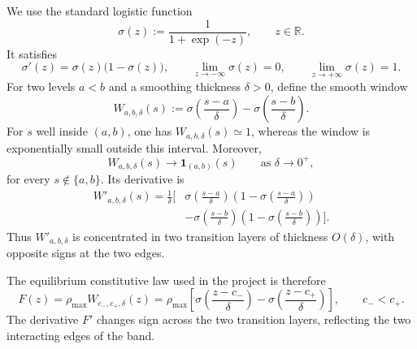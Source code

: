 \documentclass[11pt,a4paper]{article}
\newcommand{\R}{\mathbb{R}}
\begin{document}
We use the standard logistic function
\begin{equation}
  \sigma(z)
  :=\frac{1}{1+\exp(-z)},
  \qquad z\in\R.
  \label{eq:logistic-function}
\end{equation}
It satisfies
\begin{equation}
  \sigma'(z)=\sigma(z)\bigl(1-\sigma(z)\bigr),
  \qquad
  \lim_{z\to-\infty}\sigma(z)=0,
  \qquad
  \lim_{z\to+\infty}\sigma(z)=1.
  \label{eq:logistic-properties}
\end{equation}
For two levels $a<b$ and a smoothing thickness $\delta>0$, define the smooth window
\begin{equation}
  W_{a,b,\delta}(s)
  :=
  \sigma\!\left(\frac{s-a}{\delta}\right)
  -
  \sigma\!\left(\frac{s-b}{\delta}\right).
  \label{eq:logistic-window-definition}
\end{equation}
For $s$ well inside $(a,b)$, one has $W_{a,b,\delta}(s)\simeq1$, whereas the window is exponentially small outside this interval. Moreover,
\begin{equation}
  W_{a,b,\delta}(s)
  \longrightarrow \mathbf{1}_{(a,b)}(s)
  \qquad\text{as }\delta\to0^+,
  \label{eq:logistic-sharp-limit}
\end{equation}
for every $s\notin\{a,b\}$. Its derivative is
\begin{align}
  W'_{a,b,\delta}(s)
  =\frac{1}{\delta}\Bigg[
  &\sigma\!\left(\frac{s-a}{\delta}\right)
   \left(1-\sigma\!\left(\frac{s-a}{\delta}\right)\right)
  \nonumber\\
  &-
  \sigma\!\left(\frac{s-b}{\delta}\right)
   \left(1-\sigma\!\left(\frac{s-b}{\delta}\right)\right)
  \Bigg].
  \label{eq:logistic-window-derivative}
\end{align}
Thus $W'_{a,b,\delta}$ is concentrated in two transition layers of thickness $O(\delta)$, with opposite signs at the two edges.

The equilibrium constitutive law used in the project is therefore
\begin{equation}
  F(z)
  =\rho_{\max}W_{c_-,c_+,\delta}(z)
  =\rho_{\max}
  \left[
    \sigma\!\left(\frac{z-c_-}{\delta}\right)
    -
    \sigma\!\left(\frac{z-c_+}{\delta}\right)
  \right],
  \qquad c_-<c_+.
  \label{eq:F-window}
\end{equation}
The derivative $F'$ changes sign across the two transition layers, reflecting the two interacting edges of the band.
\end{document}
